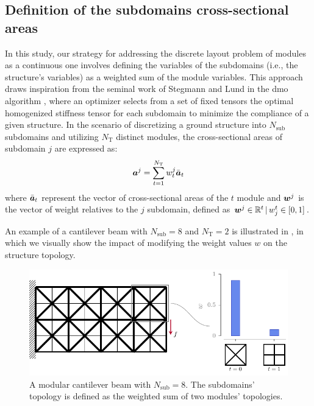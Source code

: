 \subsection{Definition of the subdomains cross-sectional areas}
In this study, our strategy for addressing the discrete layout problem of modules as a continuous one involves defining the variables of the subdomains (i.e., the structure's variables) as a weighted sum of the module variables. This approach draws inspiration from the seminal work of Stegmann and Lund in the \gls{dmo} algorithm , where an optimizer selects from a set of fixed tensors the optimal homogenized stiffness tensor for each subdomain to minimize the compliance of a given structure. In the scenario of discretizing a ground structure into $N_\text{sub}$ subdomains and utilizing $N_\text{T}$ distinct modules, the cross-sectional areas of subdomain $j$ are expressed as:  
\begin{equation}
    \bm{a}^j = \sum_{t=1}^{N_\text{T}} w_t^j \bar{\bm{a}}_t 
\end{equation}
where $\bar{\bm{a}}_t $ represent the vector of cross-sectional areas of the $t$ module and $\bm{w}^j$ is the vector of weight relatives to the $j$ subdomain, defined as $ \bm{w}^j \in \mathbb{R}^t\,|\,w_j^t \in [0,1]$.

An example of a cantilever beam with $N_\text{sub}=8$ and $N_\text{T}=2$ is illustrated in , in which we visually show the impact of modifying the weight values $w$ on the structure topology.

\begin{figure}
    \centering
    \includegraphics{figures/06_DMO/00_weight_dmo/weight_dmo.pdf}
    \caption{A modular cantilever beam with $N_\text{sub}=8$. The subdomains' topology is defined as the weighted sum of two modules' topologies.}
    \label{fig:06_weighted_sum}
\end{figure}

